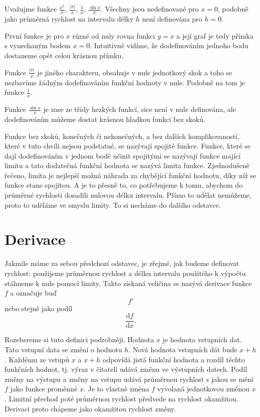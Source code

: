 \documentclass[12pt]{article}
\begin{document}
Uvažujme funkce $\frac{x^2}{x}$, $\frac{|x|}{x}$, $\frac 1{x}$, $\frac {\sin x}{x}$. Všechny jsou nedefinované pro $x=0$, podobně jako průměrná rychlost na intervalu délky $h$ není definována pro $h=0$.

První funkce je pro $x$ různé od nuly rovna funkci $y=x$ a její graf je tedy přímka s vynechaným bodem $x=0$. Intuitivně vidíme, že dodefinováním jednoho bodu dostaneme opět celou krásnou přímku.

Funkce $\frac{|x|}{x}$ je jiného charakteru, obsahuje v nule jednotkový skok a toho se nezbavíme žádným dodefinováním funkční hodnoty v nule. Podobně na tom je funkce $\frac 1x$.

Funkce $\frac{\sin x}{x}$ je zase ze třídy hezkých funkcí, sice není v nule definována, ale dodefinováním můžeme dostat krásnou hladkou funkci bez skoků.

Funkce bez skoků, konečných či nekonečných, a bez dalších komplikovaností, které v tuto chvíli nejsou podstatné, se nazývají spojité funkce. Funkce, které se dají dodefinováním v jednom bodě učinit spojitými se nazývají funkce mající limitu a tato dodatečná funkční hodnota se nazývá limita funkce. Zjednodušeně řečeno, limita je nejlepší možná náhrada za chybějící funkční hodnotu, díky níž se funkce stane spojitou. A je to přesně to, co potřebujeme k tomu, abychom do průměrné rychlosti dosadili nulovou délku intervalu. Přímo to udělat nemůžeme, proto to uděláme ve smyslu limity. To si necháme do dalšího odstavce.

\section*{Derivace}

Jakmile máme za sebou předchozí odstavec, je zřejmé, jak budeme definovat rychlost: použijeme průměrnou rychlost a délku intervalu použitého k výpočtu stáhneme k nule pomocí limity. Takto získaná veličina se nazývá derivace funkce $f$ a označuje buď $$f'$$ nebo stejně jako podíl $$\frac{\mathrm df}{\mathrm dx}.$$

Rozebereme si tuto definici podrobněji. Hodnota $x$ je hodnota vstupních dat. Tato vstupní data se změní o hodnotu $h$. Nová hodnota vstupních dát bude $x+h$. Každému ze  vstupů $x$ a $x+h$ odpovídá  jistá funkční hodnota a rozdíl těchto funkčních hodnot, tj. výraz v čitateli udává změnu ve výstupních  datech.  Podíl změny na výstupu a změny na vstupu udává průměrnou rychlost s jakou se mění $f$ jako funkce proměnné $x$.  Je to vlastně změna $f$ vyvolaná jednotkovou změnou $x$.  Limitní přechod poté průměrnou rychlost předvede na rychlost okamžitou. Derivaci proto chápeme jako okamžitou rychlost změny.
\end{document}
